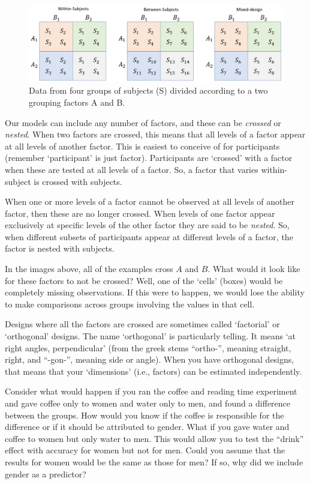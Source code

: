 \documentclass[
]{book}
\begin{document}
\begin{figure}

{\centering \includegraphics[width=1\linewidth]{./images/design_ch4_2} 

}

\caption{Data from four groups of subjects (S) divided according to a two grouping factors A and B.}\label{fig:F4-designfig2}
\end{figure}

Our models can include any number of factors, and these can be \emph{crossed} or \emph{nested}. When two factors are crossed, this means that all levels of a factor appear at all levels of another factor. This is easiest to conceive of for participants (remember `participant' is just factor). Participants are `crossed' with a factor when these are tested at all levels of a factor. So, a factor that varies within-subject is crossed with subjects.

When one or more levels of a factor cannot be observed at all levels of another factor, then these are no longer crossed. When levels of one factor appear exclusively at specific levels of the other factor they are said to be \emph{nested}. So, when different subsets of participants appear at different levels of a factor, the factor is nested with subjects.

In the images above, all of the examples cross \(A\) and \(B\). What would it look like for these factors to not be crossed? Well, one of the `cells' (boxes) would be completely missing observations. If this were to happen, we would lose the ability to make comparisons across groups involving the values in that cell.

Designs where all the factors are crossed are sometimes called `factorial' or `orthogonal' designs. The name `orthogonal' is particularly telling. It means `at right angles, perpendicular' (from the greek stems ``ortho-'', meaning straight, right, and ``-gon-'', meaning side or angle). When you have orthogonal designs, that means that your `dimensions' (i.e., factors) can be estimated independently.

Consider what would happen if you ran the coffee and reading time experiment and gave coffee only to women and water only to men, and found a difference between the groups. How would you know if the coffee is responsible for the difference or if it should be attributed to gender. What if you gave water and coffee to women but only water to men. This would allow you to test the ``drink'' effect with accuracy for women but not for men. Could you assume that the results for women would be the same as those for men? If so, why did we include gender as a predictor?
\end{document}
